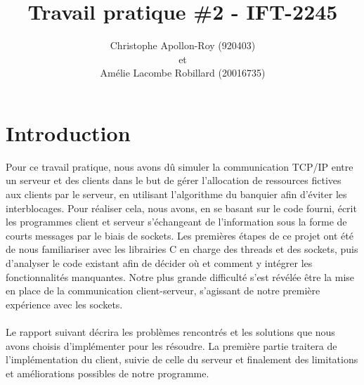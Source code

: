 \documentclass[11pt]{article}
\title{Travail pratique \#2 - IFT-2245}
\author{Christophe Apollon-Roy (920403) \\et \\Amélie Lacombe Robillard (20016735)}
\begin{document}
\maketitle
\section*{ Introduction }
\setlength{\parindent}{20pt}
Pour ce travail pratique, nous avons dû simuler la communication TCP/IP entre un serveur et des clients dans le but de gérer l'allocation 
de ressources fictives aux clients par le serveur, en utilisant l’algorithme du banquier afin d’éviter les interblocages.  Pour réaliser 
cela, nous avons, en se basant sur le code fourni, écrit les programmes client et serveur s'échangeant de l'information sous la forme de 
courts messages par le biais de sockets. Les premières étapes de ce projet ont été de nous familiariser avec les librairies C en charge des 
threads et des sockets, puis d’analyser le code existant afin de décider où et comment y intégrer les fonctionnalités manquantes. Notre plus 
grande difficulté s’est révélée être la mise en place de la communication client-serveur, s’agissant de notre première expérience avec les 
sockets.\\
\\ 
Le rapport suivant décrira les problèmes rencontrés et les solutions que nous avons choisis d’implémenter pour les résoudre. La première partie 
traitera de l’implémentation du client, suivie de celle du serveur et finalement des limitations et améliorations possibles de notre programme.\\
\\
\end{document}
